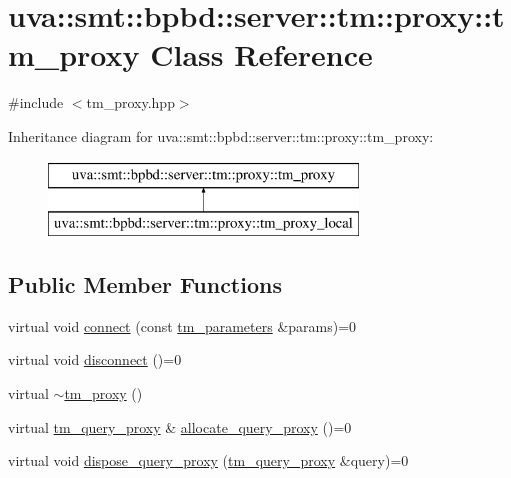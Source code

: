 \hypertarget{classuva_1_1smt_1_1bpbd_1_1server_1_1tm_1_1proxy_1_1tm__proxy}{}\section{uva\+:\+:smt\+:\+:bpbd\+:\+:server\+:\+:tm\+:\+:proxy\+:\+:tm\+\_\+proxy Class Reference}
\label{classuva_1_1smt_1_1bpbd_1_1server_1_1tm_1_1proxy_1_1tm__proxy}


{\ttfamily \#include $<$tm\+\_\+proxy.\+hpp$>$}

Inheritance diagram for uva\+:\+:smt\+:\+:bpbd\+:\+:server\+:\+:tm\+:\+:proxy\+:\+:tm\+\_\+proxy\+:\begin{figure}[H]
\begin{center}
\leavevmode
\includegraphics[height=2.000000cm]{classuva_1_1smt_1_1bpbd_1_1server_1_1tm_1_1proxy_1_1tm__proxy}
\end{center}
\end{figure}
\subsection*{Public Member Functions}
\begin{DoxyCompactItemize}
\item 
virtual void \hyperlink{classuva_1_1smt_1_1bpbd_1_1server_1_1tm_1_1proxy_1_1tm__proxy_a709c4823b451310b5e6559d37ec349c5}{connect} (const \hyperlink{structuva_1_1smt_1_1bpbd_1_1server_1_1tm_1_1tm__parameters}{tm\+\_\+parameters} \&params)=0
\item 
virtual void \hyperlink{classuva_1_1smt_1_1bpbd_1_1server_1_1tm_1_1proxy_1_1tm__proxy_af7c0b4637c6aaa4bac87f33fd034cff6}{disconnect} ()=0
\item 
virtual \hyperlink{classuva_1_1smt_1_1bpbd_1_1server_1_1tm_1_1proxy_1_1tm__proxy_a43110714b48c4dff9dc63c882f9fea0d}{$\sim$tm\+\_\+proxy} ()
\item 
virtual \hyperlink{classuva_1_1smt_1_1bpbd_1_1server_1_1tm_1_1proxy_1_1tm__query__proxy}{tm\+\_\+query\+\_\+proxy} \& \hyperlink{classuva_1_1smt_1_1bpbd_1_1server_1_1tm_1_1proxy_1_1tm__proxy_ad038abb503116db63fe0ade0646a67fa}{allocate\+\_\+query\+\_\+proxy} ()=0
\item 
virtual void \hyperlink{classuva_1_1smt_1_1bpbd_1_1server_1_1tm_1_1proxy_1_1tm__proxy_a5125504cef8c1843a65255dc6e846ae0}{dispose\+\_\+query\+\_\+proxy} (\hyperlink{classuva_1_1smt_1_1bpbd_1_1server_1_1tm_1_1proxy_1_1tm__query__proxy}{tm\+\_\+query\+\_\+proxy} \&query)=0
\end{DoxyCompactItemize}


